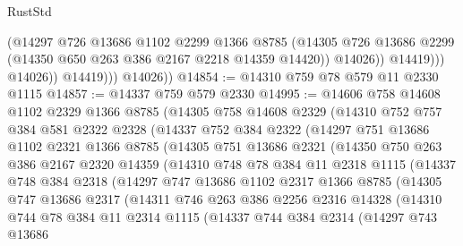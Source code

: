 \begin{lexlean}{RustStd}
\begin{coremodule}
                          (@14297
                            @726
                            @13686
                            @1102
                            @2299
                            @1366
                            @8785
                            (@14305
                              @726
                              @13686
                              @2299
                              (@14350 @650 @263 @386 @2167 @2218 @14359 @14420))
                            @14026))
                        @14419)))
                  @14026))
              @14419)))
        @14026))
@14854 := @14310 @759 @78 @579 @11 @2330 @1115
@14857 := @14337 @759 @579 @2330
@14995 := @14606
    @758
    @14608
    @1102
    @2329
    @1366
    @8785
    (@14305
      @758
      @14608
      @2329
      (@14310
        @752
        @757
        @384
        @581
        @2322
        @2328
        (@14337
          @752
          @384
          @2322
          (@14297
            @751
            @13686
            @1102
            @2321
            @1366
            @8785
            (@14305
              @751
              @13686
              @2321
              (@14350
                @750
                @263
                @386
                @2167
                @2320
                @14359
                (@14310
                  @748
                  @78
                  @384
                  @11
                  @2318
                  @1115
                  (@14337
                    @748
                    @384
                    @2318
                    (@14297
                      @747
                      @13686
                      @1102
                      @2317
                      @1366
                      @8785
                      (@14305
                        @747
                        @13686
                        @2317
                        (@14311
                          @746
                          @263
                          @386
                          @2256
                          @2316
                          @14328
                          (@14310
                            @744
                            @78
                            @384
                            @11
                            @2314
                            @1115
                            (@14337
                              @744
                              @384
                              @2314
                              (@14297
                                @743
                                @13686

\end{coremodule}
\end{lexlean}
